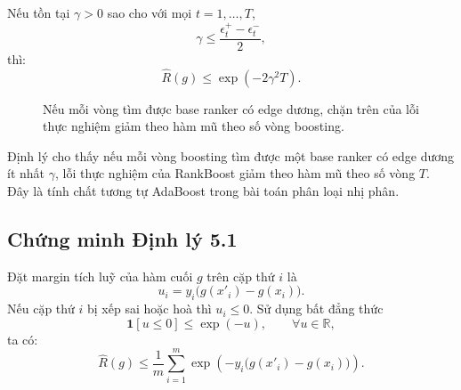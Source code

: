 Nếu tồn tại \(\gamma>0\) sao cho với mọi \(t=1,\ldots,T\),
\[
    \gamma
    \leq
    \frac{\epsilon_t^{+}-\epsilon_t^{-}}{2},
\]
thì:
\begin{equation}
    \widehat{R}(g)
    \leq
    \exp(-2\gamma^2T).
    \label{eq:section5-rankboost-exponential-bound}
\end{equation}

\begin{figure}[H]
    \centering
    \caption{Nếu mỗi vòng tìm được base ranker có edge dương, chặn trên của lỗi thực nghiệm giảm theo hàm mũ theo số vòng boosting.}
    \label{fig:section5-exponential-error-bound}
\end{figure}

Định lý cho thấy nếu mỗi vòng boosting tìm được một base ranker có edge dương ít nhất \(\gamma\), lỗi thực nghiệm của RankBoost giảm theo hàm mũ theo số vòng \(T\). Đây là tính chất tương tự AdaBoost trong bài toán phân loại nhị phân.

\subsection{Chứng minh Định lý 5.1}

Đặt margin tích luỹ của hàm cuối \(g\) trên cặp thứ \(i\) là
\[
    u_i
    =
    y_i
    \big(g(x'_i)-g(x_i)\big).
\]
Nếu cặp thứ \(i\) bị xếp sai hoặc hoà thì \(u_i\leq 0\). Sử dụng bất đẳng thức
\[
    \mathbf{1}[u\leq 0]\leq \exp(-u),
    \qquad
    \forall u\in\mathbb{R},
\]
ta có:
\[
    \widehat{R}(g)
    \leq
    \frac{1}{m}
    \sum_{i=1}^{m}
    \exp
    \left(
        -y_i
        \big(g(x'_i)-g(x_i)\big)
    \right).
\]

